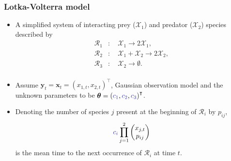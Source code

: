 \documentclass{beamer}
\newcommand{\bx}{\bm{x}}
\newcommand{\by}{\bm{y}}
\newcommand{\btheta}{\bm{\theta}}
\begin{document}
    \begin{frame}
    \frametitle{Lotka-Volterra model}
    \begin{itemize}
        \item A simplified system of interacting prey ($\mathcal{X}_1$) and predator ($\mathcal{X}_2$) species described by
        \begin{equation*}
        \begin{split}
        \mathcal{R}_1 &: \quad \mathcal{X}_1 \to 2 \mathcal{X}_1, \\
        \mathcal{R}_2 &: \quad \mathcal{X}_1 + \mathcal{X}_2 \to 2 \mathcal{X}_2, \\
        \mathcal{R}_3 &: \quad \mathcal{X}_2 \to \emptyset. \\
        \end{split}
        \end{equation*}
        \item Assume $\by_t = \bx_t = \left(x_{1,t}, x_{2,t}\right)^\intercal$, Gaussian observation model and the unknown parameters to be $\btheta = \left(\textcolor[RGB]{51,51,178}{c_1}, \textcolor[RGB]{51,51,178}{c_2}, \textcolor[RGB]{51,51,178}{c_3}\right)^\intercal$.
        \item Denoting the number of species $j$ present at the beginning of $\mathcal{R}_i$ by $p_{ij}$,
        \begin{equation*}
            \textcolor[RGB]{51,51,178}{c_i} \prod_{j=1}^{2} \begin{pmatrix}
            x_{j,t} \\
            p_{ij}
            \end{pmatrix}
        \end{equation*} is the mean time to the next occurrence of $\mathcal{R}_i$ at time $t$.
    \end{itemize}
    \end{frame}
\end{document}
